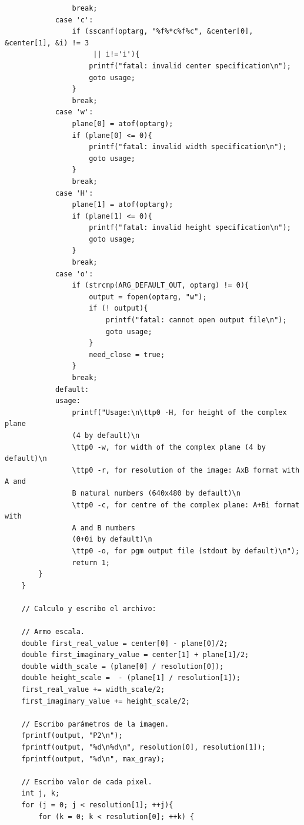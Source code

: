 \documentclass[a4paper,10pt]{article}
\begin{document}
\begin{verbatim}
                break;
            case 'c':
                if (sscanf(optarg, "%f%*c%f%c", &center[0], &center[1], &i) != 3
                	 || i!='i'){
                    printf("fatal: invalid center specification\n");
                    goto usage;
                }
                break;
            case 'w':
                plane[0] = atof(optarg);
                if (plane[0] <= 0){
                    printf("fatal: invalid width specification\n");
                    goto usage;
                }
                break;
            case 'H':
                plane[1] = atof(optarg);
                if (plane[1] <= 0){
                    printf("fatal: invalid height specification\n");
                    goto usage;
                }
                break;
            case 'o':
                if (strcmp(ARG_DEFAULT_OUT, optarg) != 0){
                    output = fopen(optarg, "w");
                    if (! output){
                        printf("fatal: cannot open output file\n");
                        goto usage;
                    }
                    need_close = true;
                }
                break;
            default:
            usage:
                printf("Usage:\n\ttp0 -H, for height of the complex plane 
                (4 by default)\n
                \ttp0 -w, for width of the complex plane (4 by default)\n
                \ttp0 -r, for resolution of the image: AxB format with A and
                B natural numbers (640x480 by default)\n
                \ttp0 -c, for centre of the complex plane: A+Bi format with
                A and B numbers 
                (0+0i by default)\n
                \ttp0 -o, for pgm output file (stdout by default)\n");
                return 1;
        }
    }
    
	// Calculo y escribo el archivo:
	
	// Armo escala.
	double first_real_value = center[0] - plane[0]/2;
    double first_imaginary_value = center[1] + plane[1]/2;
    double width_scale = (plane[0] / resolution[0]);
    double height_scale =  - (plane[1] / resolution[1]);
    first_real_value += width_scale/2;
    first_imaginary_value += height_scale/2;
	
	// Escribo parámetros de la imagen.
	fprintf(output, "P2\n");
	fprintf(output, "%d\n%d\n", resolution[0], resolution[1]);
	fprintf(output, "%d\n", max_gray);

	// Escribo valor de cada pixel.
	int j, k;
	for (j = 0; j < resolution[1]; ++j){
		for (k = 0; k < resolution[0]; ++k) {
            

\end{verbatim}
\end{document}

